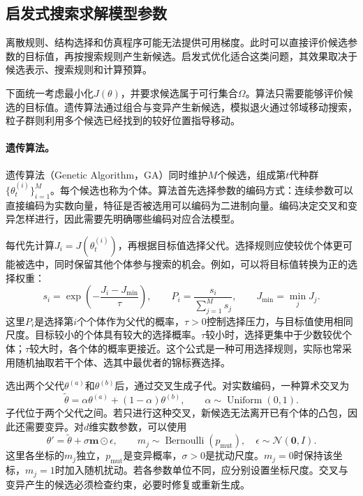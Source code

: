 \subsection{启发式搜索求解模型参数}
离散规则、结构选择和仿真程序可能无法提供可用梯度。此时可以直接评价候选参数的目标值，再按搜索规则产生新候选。启发式优化适合这类问题，其效果取决于候选表示、搜索规则和计算预算。

下面统一考虑最小化$J(\theta)$，并要求候选属于可行集合$\Omega$。算法只需要能够评价候选的目标值。遗传算法通过组合与变异产生新候选，模拟退火通过邻域移动搜索，粒子群则利用多个候选已经找到的较好位置指导移动。

\paragraph{遗传算法。}
遗传算法（Genetic Algorithm，GA）同时维护$M$个候选，组成第$t$代种群$\{\theta_t^{(i)}\}_{i=1}^M$。每个候选也称为个体。算法首先选择参数的编码方式：连续参数可以直接编码为实数向量，特征是否被选用可以编码为二进制向量。编码决定交叉和变异怎样进行，因此需要先明确哪些编码对应合法模型。

每代先计算$J_i=J(\theta_t^{(i)})$，再根据目标值选择父代。选择规则应使较优个体更可能被选中，同时保留其他个体参与搜索的机会。例如，可以将目标值转换为正的选择权重：
\begin{equation}
 s_i=\exp\left(-\frac{J_i-J_{\min}}{\tau}\right),\qquad
 P_i=\frac{s_i}{\sum_{j=1}^M s_j},\qquad J_{\min}=\min_j J_j.
 \label{eq:solving-ga-selection}
\end{equation}
这里$P_i$是选择第$i$个个体作为父代的概率，$\tau>0$控制选择压力，与目标值使用相同尺度。目标较小的个体具有较大的选择概率。$\tau$较小时，选择更集中于少数较优个体；$\tau$较大时，各个体的概率更接近。这个公式是一种可用选择规则，实际也常采用随机抽取若干个体、选其中最优者的锦标赛选择。

选出两个父代$\theta^{(a)}$和$\theta^{(b)}$后，通过交叉生成子代。对实数编码，一种算术交叉为
\begin{equation}
 \widetilde\theta=\alpha\theta^{(a)}+(1-\alpha)\theta^{(b)},\qquad
 \alpha\sim\operatorname{Uniform}(0,1).
\end{equation}
子代位于两个父代之间。若只进行这种交叉，新候选无法离开已有个体的凸包，因此还需要变异。对$d$维实数参数，可以使用
\begin{equation}
 \theta'=\widetilde\theta+\sigma\bm m\odot\epsilon,\qquad
 m_j\sim\operatorname{Bernoulli}(p_{\mathrm{mut}}),\quad
 \epsilon\sim\mathcal N(\bm0,I).
 \label{eq:solving-ga-mutation}
\end{equation}
这里各坐标的$m_j$独立，$p_{\mathrm{mut}}$是变异概率，$\sigma>0$是扰动尺度。$m_j=0$时保持该坐标，$m_j=1$时加入随机扰动。若各参数单位不同，应分别设置坐标尺度。交叉与变异产生的候选必须检查约束，必要时修复或重新生成。

